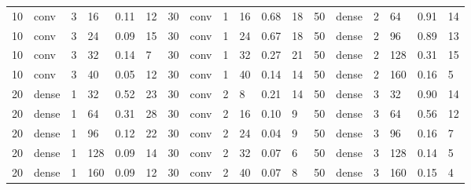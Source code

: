 \begin{table}[t!]
{\begin{tabular}{@{}llllll|llllll|llllll@{}}
10          & conv       & 3          & 16         & 0.11         & 12           & 30          & conv       & 1          & 16         & 0.68         & 18           & 50          & dense      & 2          & 64         & 0.91         & 14           \\
10          & conv       & 3          & 24         & 0.09         & 15           & 30          & conv       & 1          & 24         & 0.67         & 18           & 50          & dense      & 2          & 96         & 0.89         & 13           \\
10          & conv       & 3          & 32         & 0.14         & 7            & 30          & conv       & 1          & 32         & 0.27         & 21           & 50          & dense      & 2          & 128        & 0.31         & 15           \\
10          & conv       & 3          & 40         & 0.05         & 12           & 30          & conv       & 1          & 40         & 0.14         & 14           & 50          & dense      & 2          & 160        & 0.16         & 5            \\
20          & dense      & 1          & 32         & 0.52         & 23           & 30          & conv       & 2          & 8          & 0.21         & 14           & 50          & dense      & 3          & 32         & 0.90         & 14           \\
20          & dense      & 1          & 64         & 0.31         & 28           & 30          & conv       & 2          & 16         & 0.10         & 9            & 50          & dense      & 3          & 64         & 0.56         & 12           \\
20          & dense      & 1          & 96         & 0.12         & 22           & 30          & conv       & 2          & 24         & 0.04         & 9            & 50          & dense      & 3          & 96         & 0.16         & 7            \\
20          & dense      & 1          & 128        & 0.09         & 14           & 30          & conv       & 2          & 32         & 0.07         & 6            & 50          & dense      & 3          & 128        & 0.14         & 5            \\
20          & dense      & 1          & 160        & 0.09         & 12           & 30          & conv       & 2          & 40         & 0.07         & 8            & 50          & dense      & 3          & 160        & 0.15         & 4            \\

\end{tabular}}
\end{table}

